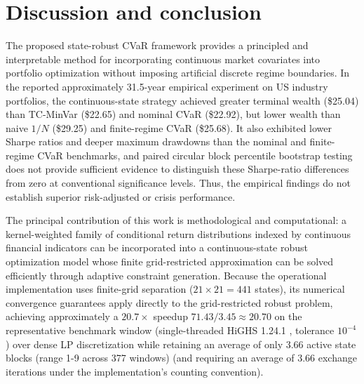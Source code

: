 \documentclass[smallextended]{svjour3}
\begin{document}
\section{Discussion and conclusion}\label{sec:conclusion}
The proposed state-robust CVaR framework provides a principled and interpretable method for incorporating continuous market covariates into portfolio optimization without imposing artificial discrete regime boundaries. In the reported approximately 31.5-year empirical experiment on US industry portfolios, the continuous-state strategy achieved greater terminal wealth (\$25.04) than TC-MinVar (\$22.65) and nominal CVaR (\$22.92), but lower wealth than naive $1/N$ (\$29.25) and finite-regime CVaR (\$25.68). It also exhibited lower Sharpe ratios and deeper maximum drawdowns than the nominal and finite-regime CVaR benchmarks, and paired circular block percentile bootstrap testing does not provide sufficient evidence to distinguish these Sharpe-ratio differences from zero at conventional significance levels. Thus, the empirical findings do not establish superior risk-adjusted or crisis performance.

The principal contribution of this work is methodological and computational: a kernel-weighted family of conditional return distributions indexed by continuous financial indicators can be incorporated into a continuous-state robust optimization model whose finite grid-restricted approximation can be solved efficiently through adaptive constraint generation. Because the operational implementation uses finite-grid separation ($21\times21 = 441$ states), its numerical convergence guarantees apply directly to the grid-restricted robust problem, achieving approximately a $20.7\times$ speedup $71.43/3.45\approx20.70$ on the representative benchmark window (single-threaded HiGHS 1.24.1 \cite{huangfu2018parallelizing}, tolerance $10^{-4}$) over dense LP discretization while retaining an average of only 3.66 active state blocks (range 1-9 across 377 windows) (and requiring an average of 3.66 exchange iterations under the implementation's counting convention).
\end{document}

